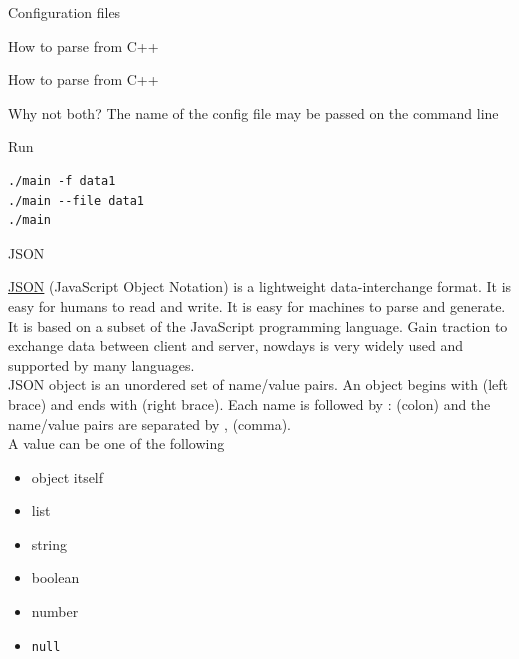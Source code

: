 \documentclass[10pt,aspectratio=169]{beamer}
\begin{document}
\begin{frame}[fragile]{Configuration files}
    
\end{frame}

\begin{frame}[fragile]{How to parse from C++}
    
\end{frame}

\begin{frame}[fragile]{How to parse from C++}
    
\end{frame}

\begin{frame}[fragile]{Why not both?}
    The name of the config file may be passed on the command line
        
    
\end{frame}

\begin{frame}[fragile]{Run}
    \begin{verbatim}
./main -f data1
./main --file data1
./main
    \end{verbatim}
\end{frame}



\begin{frame}{JSON}

\href{https://www.json.org/json-en.html}{JSON} (JavaScript Object Notation) is a lightweight data-interchange format. It is easy for humans to read and write. It is easy for machines to parse and generate. It is based on a subset of the JavaScript programming language. Gain traction to exchange data between client and server, nowdays is very widely used and supported by many languages.\\[0.5cm]

JSON object is an unordered set of name/value pairs. An object begins with { (left brace) and ends with } (right brace). Each name is followed by : (colon) and the name/value pairs are separated by , (comma).\\[0.5cm]

A value can be one of the following
\begin{multicols}{2}
\begin{itemize}
\item object itself
\item list
\item string
\item boolean
\item number 
\item \texttt{null}
\end{itemize}
\end{multicols}

\end{frame}
\end{document}
